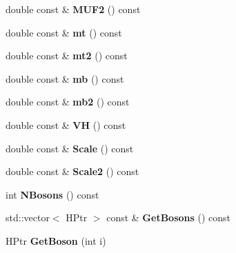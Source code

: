 \begin{DoxyCompactItemize}
\item 
\hypertarget{classHiggsModel_af636a81480654395084ead903d5ee00b}{}double const \& {\bfseries M\+U\+F2} () const \label{classHiggsModel_af636a81480654395084ead903d5ee00b}

\item 
\hypertarget{classHiggsModel_a913923ce15ea38a8a1576ea9e5d23d10}{}double const \& {\bfseries mt} () const \label{classHiggsModel_a913923ce15ea38a8a1576ea9e5d23d10}

\item 
\hypertarget{classHiggsModel_ad0685a0848a95342b272147317948d10}{}double const \& {\bfseries mt2} () const \label{classHiggsModel_ad0685a0848a95342b272147317948d10}

\item 
\hypertarget{classHiggsModel_a8ec3f6255ab720fb08a94937d436cdea}{}double const \& {\bfseries mb} () const \label{classHiggsModel_a8ec3f6255ab720fb08a94937d436cdea}

\item 
\hypertarget{classHiggsModel_a33ea2c639935f9971bdca5e5994325ff}{}double const \& {\bfseries mb2} () const \label{classHiggsModel_a33ea2c639935f9971bdca5e5994325ff}

\item 
\hypertarget{classHiggsModel_a9711ab1e2b584f86d75f6e53b9a35822}{}double const \& {\bfseries V\+H} () const \label{classHiggsModel_a9711ab1e2b584f86d75f6e53b9a35822}

\item 
\hypertarget{classHiggsModel_af679483d403b1d8b2f291542215fa0bd}{}double const \& {\bfseries Scale} () const \label{classHiggsModel_af679483d403b1d8b2f291542215fa0bd}

\item 
\hypertarget{classHiggsModel_a2572b90895176763db5cbbb3233ec242}{}double const \& {\bfseries Scale2} () const \label{classHiggsModel_a2572b90895176763db5cbbb3233ec242}

\item 
\hypertarget{classHiggsModel_a08c33da1ef0b46ed04dd5f1f9f84ae9a}{}int {\bfseries N\+Bosons} () const \label{classHiggsModel_a08c33da1ef0b46ed04dd5f1f9f84ae9a}

\item 
\hypertarget{classHiggsModel_a56909ae8843fbd15bc54df272e1a245d}{}std\+::vector$<$ H\+Ptr $>$ const \& {\bfseries Get\+Bosons} () const \label{classHiggsModel_a56909ae8843fbd15bc54df272e1a245d}

\item 
\hypertarget{classHiggsModel_afa9a44f6a2bd358d887acd5771253953}{}H\+Ptr {\bfseries Get\+Boson} (int i)\label{classHiggsModel_afa9a44f6a2bd358d887acd5771253953}


\end{DoxyCompactItemize}
